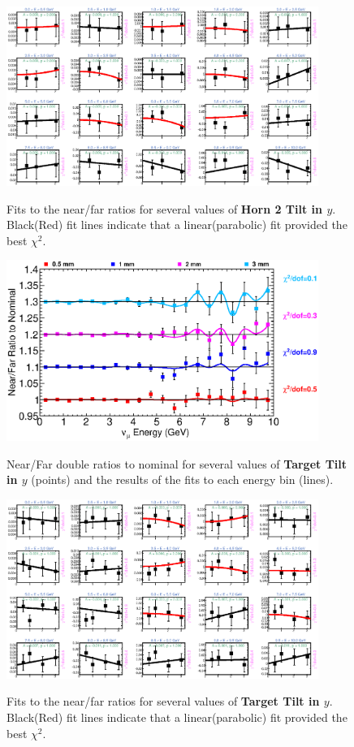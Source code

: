 \begin{figure}[hb]
  \begin{center}
    {\includegraphics[width=4.0in]{figures/Horn2YTilt_nof_fits.eps}}
  \end{center}
\caption{ Fits to the near/far ratios for several values of {\bf Horn 2 Tilt in $y$}. Black(Red) fit lines indicate that a linear(parabolic) fit provided the best $\chi^2$. }
\end{figure}

\clearpage

\begin{figure}[ht]
  \begin{center}
    {\includegraphics[width=4.0in]{figures/TargetYTilt_nof_summary.eps}}
  \end{center}
\caption{ Near/Far double ratios to nominal for several values of {\bf Target Tilt in $y$} (points) and the results of the fits to each energy bin (lines).}
\end{figure}

\begin{figure}[hb]
  \begin{center}
    {\includegraphics[width=4.0in]{figures/TargetYTilt_nof_fits.eps}}
  \end{center}
\caption{ Fits to the near/far ratios for several values of {\bf Target Tilt in $y$}. Black(Red) fit lines indicate that a linear(parabolic) fit provided the best $\chi^2$. }
\end{figure}

